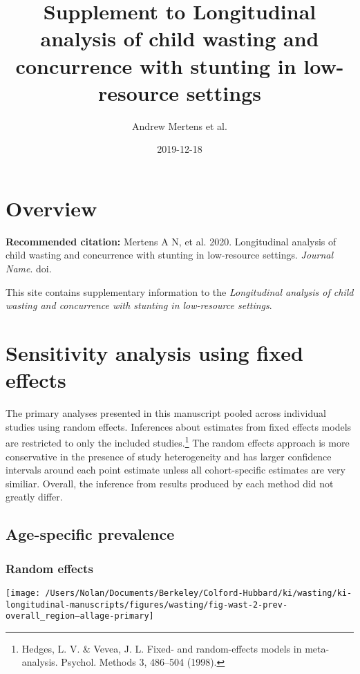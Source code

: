 \documentclass[9pt,]{book}
\title{Supplement to Longitudinal analysis of child wasting and concurrence
with stunting in low-resource settings}
\author{Andrew Mertens et al.}
\date{2019-12-18}
\let\rmarkdownfootnote\footnote%
\def\footnote{\protect\rmarkdownfootnote}
\begin{document}
\maketitle

{
\setcounter{tocdepth}{1}
\tableofcontents
}
\chapter{Overview}\label{overview}

\textbf{Recommended citation:} Mertens A N, et al. 2020. Longitudinal
analysis of child wasting and concurrence with stunting in low-resource
settings. \emph{Journal Name}. doi.

This site contains supplementary information to the \emph{Longitudinal
analysis of child wasting and concurrence with stunting in low-resource
settings}.

\chapter{Sensitivity analysis using fixed effects}\label{fixed-effects}

\raggedright

The primary analyses presented in this manuscript pooled across
individual studies using random effects. Inferences about estimates from
fixed effects models are restricted to only the included
studies.\footnote{Hedges, L. V. \& Vevea, J. L. Fixed- and
  random-effects models in meta-analysis. Psychol. Methods 3, 486--504
  (1998).} The random effects approach is more conservative in the
presence of study heterogeneity and has larger confidence intervals
around each point estimate unless all cohort-specific estimates are very
similiar. Overall, the inference from results produced by each method
did not greatly differ.

\section{Age-specific prevalence}\label{age-specific-prevalence}

\subsection{Random effects}\label{random-effects}

\texttt{[image: /Users/Nolan/Documents/Berkeley/Colford-Hubbard/ki/wasting/ki-longitudinal-manuscripts/figures/wasting/fig-wast-2-prev-overall\_region--allage-primary]}
\end{document}
